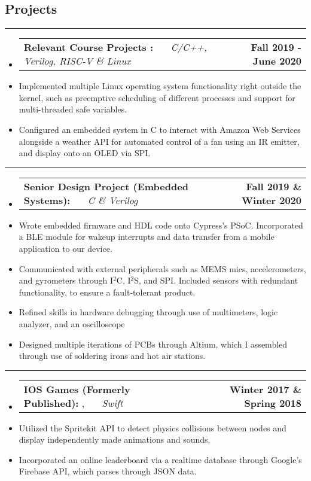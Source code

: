 \documentclass[10pt,letterpaper]{article}
\makeatletter
\newcommand{\items}[2]
{
	\begin{tabular*}{\linewidth}{l @{\extracolsep{\fill}} r}
		#1 & #2 \\
	\end{tabular*}
}
\newcommand{\sectionbreak}
{
	\vspace{-1.2em}
	\rule{\textwidth}{1.7pt}
	\vspace{-1.7em}
}
\makeatother
\begin{document}
\subsection*{Projects}
\sectionbreak

\begin{itemize}
	\item[]
		\items
			{\textbf{Relevant Course Projects :} \ \ \ \footnotesize  \emph{C/C++, Verilog, RISC-V \& Linux} }
			{\textbf{Fall 2019 - June 2020}}
		\item
			Implemented multiple Linux operating system functionality right outside the kernel, such as preemptive scheduling of different processes and support for multi-threaded safe variables.
		\item 
			Configured an embedded system in C to interact with Amazon Web Services alongside a weather API for automated control of a fan using an IR emitter, and display onto an OLED via SPI.
\end{itemize}

\hrule 

\begin{itemize}
	\item[]
		\items 
		{
			\textbf{Senior Design Project (Embedded Systems): }
			\emph{\smash{Smart Dog Collar}} \ \ \ \footnotesize \emph{C \& Verilog}
		}
			{\textbf{Fall 2019 \& Winter 2020}}
		\item 
			Wrote embedded firmware and HDL code onto Cypress's PSoC. Incorporated a BLE module for wakeup interrupts and data transfer from a mobile application to our device. 
		\item 
			Communicated with external peripherals such as MEMS mics, accelerometers, and gyrometers through I$^{2}$C, I$^{2}$S, and SPI. Included sensors with redundant functionality, to ensure a fault-tolerant product.
		\item 
			Refined skills in hardware debugging through use of multimeters, logic analyzer, and an oscilloscope 
		\item
			Designed multiple iterations of PCBs through Altium, which I assembled through use of soldering irons and hot air stations.

\end{itemize}

\hrule

\begin{itemize}
	\item[]
		\items 
		{
			\textbf{IOS Games (Formerly Published): }
			\href{https://appadvice.com/app/round-bound/1369632746}{\emph{\underline{\smash{Round 'a Bound}}}}, 
			\href{https://appadvice.com/app/tic-tac-emoji/1346934986}{\emph{\underline{\smash{Tic-Tac Emoji}}}} \ \ \ \footnotesize  \emph{Swift}
		}
			{\textbf{Winter 2017 \& Spring 2018}}
		\item 
			Utilized the Spritekit API to detect physics collisions between nodes and display independently made animations and sounds.
		\item
			Incorporated an online leaderboard via a realtime database through Google's Firebase API, which parses through JSON data. 
\end{itemize}
\end{document}
